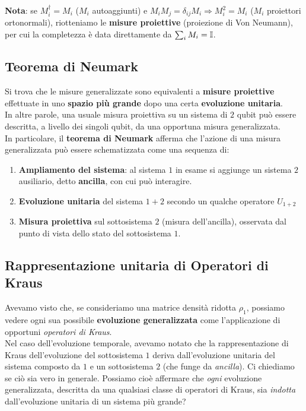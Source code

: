 \documentclass[../../InformazioneQuantistica.tex]{subfiles}
\begin{document}
\textbf{Nota}: se $M_i^\dag = M_i$ ($M_i$ autoaggiunti) e $M_i M_j = \delta_{ij}M_i \Rightarrow M_i^2 = M_i$ ($M_i$ proiettori ortonormali), riotteniamo le \textbf{misure proiettive} (proiezione di Von Neumann), per cui la completezza è data direttamente da $\sum_i M_i = \mathbb{I}$.

\subsection{Teorema di Neumark}
Si trova che le misure generalizzate sono equivalenti a \textbf{misure proiettive} effettuate in uno \textbf{spazio più grande} dopo una certa \textbf{evoluzione unitaria}.\\

In altre parole, una usuale misura proiettiva su un sistema di $2$ qubit può essere descritta, a livello dei singoli qubit, da una opportuna misura generalizzata.\\

In particolare, il \textbf{teorema di Neumark} afferma che l'azione di una misura generalizzata può essere schematizzata come una sequenza di:
\begin{enumerate}
\item \textbf{Ampliamento del sistema}: al sistema $1$ in esame si aggiunge un sistema $2$ ausiliario, detto \textbf{ancilla}, con cui può interagire.
\item \textbf{Evoluzione unitaria} del sistema $1+2$ secondo un qualche operatore $U_{1+2}$
\item \textbf{Misura proiettiva} sul sottosistema $2$ (misura dell'ancilla), osservata dal punto di vista dello stato del sottosistema $1$.
\end{enumerate}

\subsection{Rappresentazione unitaria di Operatori di Kraus}
Avevamo visto che, se consideriamo una matrice densità ridotta $\rho_1$, possiamo vedere ogni sua possibile \textbf{evoluzione generalizzata} come l'applicazione di opportuni \textit{operatori di Kraus}.\\ Nel caso dell'evoluzione temporale, avevamo notato che la rappresentazione di Kraus dell'evoluzione del sottosistema $1$ deriva dall'evoluzione unitaria del sistema composto da $1$ e un sottosistema $2$ (che funge da \textit{ancilla}). Ci chiediamo se ciò sia vero in generale. Possiamo cioè affermare che \textit{ogni} evoluzione generalizzata, descritta da una qualsiasi classe di operatori di Kraus, sia \textit{indotta} dall'evoluzione unitaria di un sistema più grande?
\end{document}
